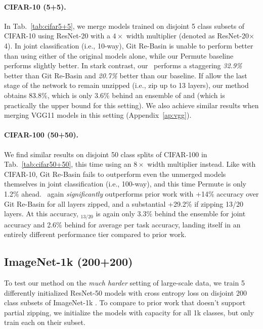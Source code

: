 
\paragraph{CIFAR-10 (5+5).}
In Tab.~\ref{tab:cifar5+5}, we merge models trained on disjoint 5 class subsets of CIFAR-10 using ResNet-20 with a $4\times$ width multiplier (denoted as ResNet-20$\times$4). In joint classification (i.e., 10-way), Git Re-Basin is unable to perform better than using either of the original models alone, while our Permute baseline performs slightly better.
In stark contrast, our \name{}\ performs a staggering \textit{32.9\%} better than Git Re-Basin and \textit{20.7\%} better than our baseline.
If allow the last stage of the network to remain unzipped (i.e., zip up to 13 layers), our method obtains 83.8\%, which is only 3.6\% behind an ensemble of  and  (which is practically the upper bound for this setting).
We also achieve similar results when merging VGG11 models in this setting (Appendix~\ref{ap:vgg}).

\vspace{-0.2em}
\paragraph{CIFAR-100 (50+50).}
We find similar results on disjoint 50 class splits of CIFAR-100 in Tab.~\ref{tab:cifar50+50}, this time using an $8\times$ width multiplier instead. Like with CIFAR-10, Git Re-Basin fails to outperform even the unmerged models themselves in joint classification (i.e., 100-way), and this time Permute is only 1.2\% ahead. \name{}\ again \textit{significantly} outperforms prior work with +14\% accuracy over Git Re-Basin for all layers zipped, and a substantial +29.2\% if zipping 13/20 layers. At this accuracy, \name{}$_{13/20}$ is again only 3.3\% behind the ensemble for joint accuracy and 2.6\% behind for average per task accuracy, landing itself in an entirely different performance tier compared to prior work.




\vspace{-0.5em}
\subsection{ImageNet-1k (200+200)}
To test our method on the \textit{much harder} setting of large-scale data, we train 5 differently initialized ResNet-50 models with cross entropy loss on disjoint 200 class subsets of ImageNet-1k \cite{deng2009imagenet}.
To compare to prior work that doesn't support partial zipping, we initialize the models with capacity for all 1k classes, but only train each on their subset.

